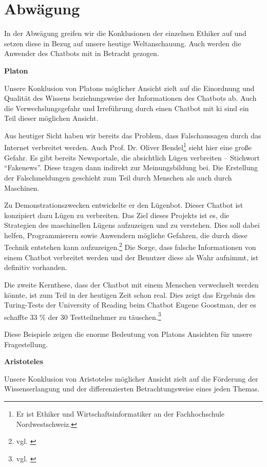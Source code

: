 \section{Abwägung}

In der Abwägung greifen wir die Konklusionen der einzelnen Ethiker auf und setzen diese in Bezug auf unsere heutige Weltanschauung. Auch werden die Anwender des Chatbots mit in Betracht gezogen.

\textbf{Platon}

Unsere Konklusion von Platons möglicher Ansicht zielt auf die Einordnung und Qualität des Wissens beziehungsweise der Informationen des Chatbots ab. Auch die Verwechslungsgefahr und Irreführung durch einen Chatbot mit \ac{ki} sind ein Teil dieser möglichen Ansicht.

Aus heutiger Sicht haben wir bereits das Problem, dass Falschaussagen durch das Internet verbreitet werden. Auch Prof. Dr. Oliver Bendel\footnote{Er ist Ethiker und Wirtschaftsinformatiker an der Fachhochschule Nordwestschweiz.} sieht hier eine große Gefahr. 
Es gibt bereits Newsportale, die absichtlich Lügen verbreiten -- Stichwort \enquote{Fakenews}. 
Diese tragen dann indirekt zur Meinungsbildung bei. 
Die Erstellung der Falschmeldungen geschieht zum Teil durch Menschen als auch durch Maschinen. 

Zu Demonstrationszwecken entwickelte er den Lügenbot. Dieser Chatbot ist konzipiert dazu Lügen zu verbreiten. 
Das Ziel dieses Projekts ist es, die Strategien des maschinellen Lügens aufzuzeigen und zu verstehen. 
Dies soll dabei helfen, Programmierern sowie Anwendern mögliche Gefahren, die durch diese Technik entstehen kann aufzuzeigen.\footnote{vgl. \cite{Bendel}}  Die Sorge, dass falsche Informationen von einem Chatbot verbreitet werden und der Benutzer diese als Wahr aufnimmt, ist definitiv vorhanden.

Die zweite Kernthese, dass der Chatbot mit einem Menschen verwechselt werden könnte, ist zum Teil in der heutigen Zeit schon real.
Dies zeigt das Ergebnis des Turing-Tests der University of Reading beim Chatbot \glqq Eugene Goostman\grqq, der es schaffte 33 \% der 30 Testteilnehmer zu täuschen.\footnote{vgl. \cite{UnivOfReading}} 

Diese Beispiele zeigen die enorme Bedeutung von Platons Ansichten für unsere Fragestellung. 

\textbf{Aristoteles}

Unsere Konklusion von Aristoteles möglicher Ansicht zielt auf die Förderung der Wissenserlangung und der differenzierten Betrachtungsweise eines jeden Themas.

